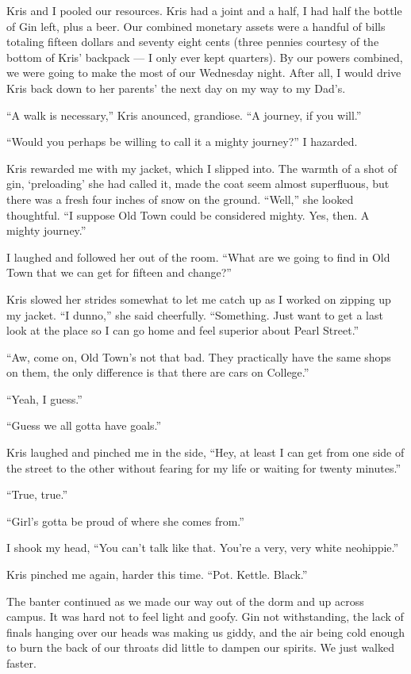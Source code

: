 Kris and I pooled our resources.  Kris had a joint and a half, I had half the bottle of Gin left, plus a beer.  Our combined monetary assets were a handful of bills totaling fifteen dollars and seventy eight cents (three pennies courtesy of the bottom of Kris' backpack --- I only ever kept quarters).  By our powers combined, we were going to make the most of our Wednesday night.  After all, I would drive Kris back down to her parents' the next day on my way to my Dad's.

``A walk is necessary,'' Kris anounced, grandiose.  ``A journey, if you will.''

``Would you perhaps be willing to call it a mighty journey?'' I hazarded.

Kris rewarded me with my jacket, which I slipped into.  The warmth of a shot of gin, `preloading' she had called it, made the coat seem almost superfluous, but there was a fresh four inches of snow on the ground.  ``Well,'' she looked thoughtful.  ``I suppose Old Town could be considered mighty.  Yes, then.  A mighty journey.''

I laughed and followed her out of the room.  ``What are we going to find in Old Town that we can get for fifteen and change?''

Kris slowed her strides somewhat to let me catch up as I worked on zipping up my jacket.  ``I dunno,'' she said cheerfully.  ``Something.  Just want to get a last look at the place so I can go home and feel superior about Pearl Street.''

``Aw, come on, Old Town's not that bad.  They practically have the same shops on them, the only difference is that there are cars on College.''

``Yeah, I guess.''

``Guess we all gotta have goals.''

Kris laughed and pinched me in the side, ``Hey, at least I can get from one side of the street to the other without fearing for my life or waiting for twenty minutes.''

``True, true.''

``Girl's gotta be proud of where she comes from.''

I shook my head, ``You can't talk like that.  You're a very, very white neohippie.''

Kris pinched me again, harder this time.  ``Pot.  Kettle.  Black.''

The banter continued as we made our way out of the dorm and up across campus.  It was hard not to feel light and goofy.  Gin not withstanding, the lack of finals hanging over our heads was making us giddy, and the air being cold enough to burn the back of our throats did little to dampen our spirits.  We just walked faster.

